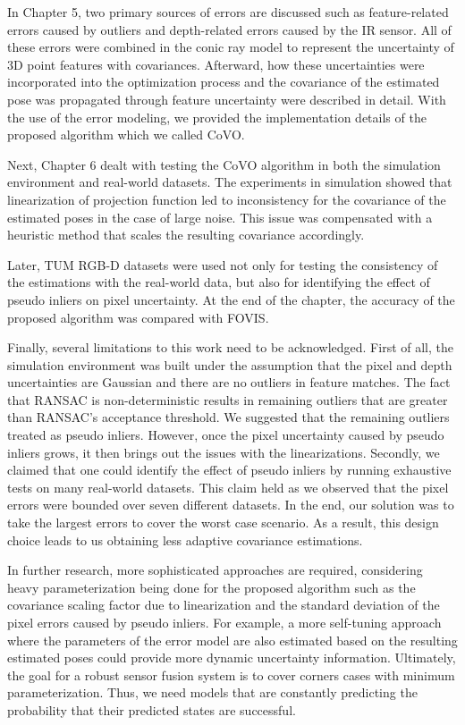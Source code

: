 \documentclass[12pt]{report}
\numberwithin{figure}{section}
\begin{document}
In Chapter 5, two primary sources of errors are discussed such as
feature-related errors caused by outliers and depth-related errors caused by
the IR sensor.  All of these errors were combined in the conic ray model to
represent the uncertainty of 3D point features with covariances.
Afterward, how these uncertainties were incorporated into the optimization
process and the covariance of the estimated pose was propagated through feature
uncertainty were described in detail. With the use of the error modeling, we
provided the implementation details of the proposed algorithm which we called
CoVO.

Next, Chapter 6 dealt with testing the CoVO algorithm in both the simulation
environment and real-world datasets. 
The experiments in simulation showed that linearization of projection function
led to inconsistency for the covariance of the estimated poses in the case of
large noise.  This issue was compensated with a heuristic method that scales
the resulting covariance accordingly.

Later, TUM RGB-D datasets were used not only for testing the consistency of the
estimations with the real-world data, but also for identifying the effect of
pseudo inliers on pixel uncertainty. 
At the end of the chapter, the accuracy of the proposed algorithm was compared
with FOVIS.

Finally, several limitations to this work need to be acknowledged.  First of
all, the simulation environment was built under the assumption that the pixel
and depth uncertainties are Gaussian and there are no outliers in feature
matches. The fact that RANSAC is non-deterministic results in remaining
outliers that are greater than RANSAC's acceptance threshold. We suggested that
the remaining outliers treated as pseudo inliers.  However, once the pixel
uncertainty caused by pseudo inliers grows, it then brings out the issues with
the linearizations.  Secondly, we claimed that 
one could identify the effect of pseudo inliers by running exhaustive tests on 
many real-world datasets. 
This claim held as we observed that the pixel errors were bounded 
over seven different datasets. In the end, our solution was to take the largest
errors to cover the worst case scenario.  As a result, this design choice 
leads to us obtaining less 
adaptive covariance estimations. 

In further research, more sophisticated approaches are required, considering
heavy parameterization being done for the proposed algorithm such as the covariance
scaling factor due to linearization and the standard deviation of the
pixel errors caused by pseudo inliers. For example, a more self-tuning approach
where the parameters of the error model are also estimated based on the
resulting estimated poses could provide more dynamic uncertainty information.
Ultimately, the goal for a robust sensor fusion system is to cover
corners cases with minimum parameterization.  Thus, we need models that are
constantly predicting the probability that their predicted states are
successful.
\end{document}
